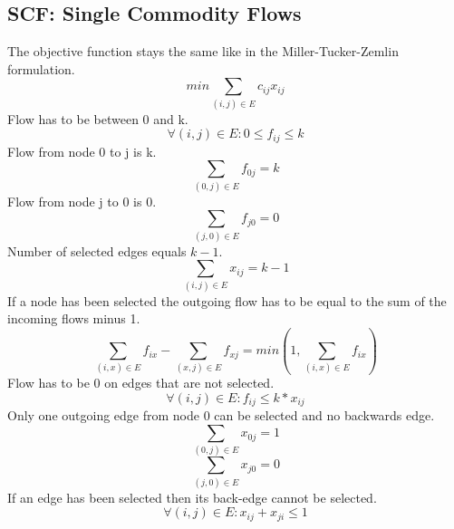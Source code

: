 \documentclass{article}
\begin{document}
\subsection{SCF: Single Commodity Flows \label{scf}}
The objective function stays the same like in the Miller-Tucker-Zemlin formulation.
\setcounter{equation}{0}
\begin{equation}
min \sum_{(i,j) \in E} c_{ij} x_{ij}
\end{equation}
Flow has to be between 0 and k.
\begin{equation}
\forall (i,j) \in E : 0 \le f_{ij} \le k 
\end{equation}
Flow from node 0 to j is k.
\begin{equation}
\sum_{(0,j) \in E} f_{0j} = k
\end{equation}
Flow from node j to 0 is 0.
\begin{equation}
\sum_{(j,0) \in E} f_{j0} = 0
\end{equation}
Number of selected edges equals $k-1$.
\begin{equation}
\sum_{(i,j) \in E} x_{ij} = k - 1
\end{equation}
If a node has been selected the outgoing flow has to be equal to the sum of the incoming flows minus 1. 
\begin{equation}
\sum_{(i,x) \in E} f_{ix} - \sum_{(x,j) \in E} f_{xj} = min(1, \sum_{(i,x) \in E} f_{ix})
\end{equation}
Flow has to be 0 on edges that are not selected.
\begin{equation}
\forall (i,j) \in E : f_{ij} \le k*x_{ij}
\end{equation}
Only one outgoing edge from node 0 can be selected and no backwards edge.
\begin{equation}
\sum_{(0,j) \in E} x_{0j} = 1
\end{equation}
\begin{equation}
\sum_{(j,0) \in E} x_{j0} = 0
\end{equation}
If an edge has been selected then its back-edge cannot be selected.
\begin{equation}
\forall (i,j) \in E: x_{ij} + x_{ji} \le 1
\end{equation}
\end{document}
